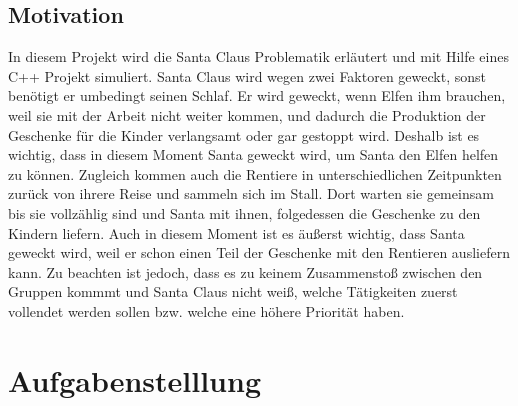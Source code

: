 \documentclass[a4paper,12pt]{exam}
\begin{document}
\subsection{Motivation}
In diesem Projekt wird die Santa Claus Problematik erläutert und mit Hilfe eines C++ Projekt simuliert. Santa Claus wird wegen 
zwei Faktoren geweckt, sonst benötigt er umbedingt seinen Schlaf. Er wird geweckt, wenn Elfen ihm brauchen, weil sie mit der Arbeit
nicht weiter kommen, und dadurch die Produktion der Geschenke für die Kinder verlangsamt oder gar gestoppt wird. Deshalb ist es wichtig, dass 
in diesem Moment Santa geweckt wird, um Santa den Elfen helfen zu können. Zugleich kommen auch die Rentiere in unterschiedlichen Zeitpunkten zurück von ihrere Reise und sammeln sich im Stall.
Dort warten sie gemeinsam bis sie vollzählig sind und Santa mit ihnen, folgedessen die Geschenke zu den Kindern liefern. Auch in diesem Moment ist es
äußerst wichtig, dass Santa geweckt wird, weil er schon einen Teil der Geschenke mit den Rentieren ausliefern kann. Zu beachten ist jedoch, dass es zu keinem Zusammenstoß zwischen den Gruppen kommmt
und Santa Claus nicht weiß, welche Tätigkeiten zuerst vollendet werden sollen bzw. welche eine höhere Priorität haben.
\newpage

\section{Aufgabenstelllung}
\end{document}
